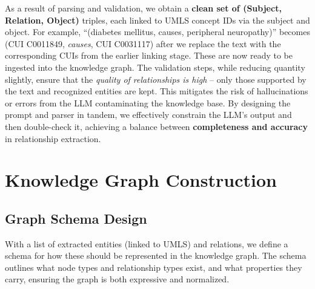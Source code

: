 As a result of parsing and validation, we obtain a \textbf{clean set of (Subject, Relation, Object)} triples, each linked to UMLS concept IDs via the subject and object. For example, ``(diabetes mellitus, causes, peripheral neuropathy)'' becomes (CUI C0011849, \textit{causes}, CUI C0031117) after we replace the text with the corresponding CUIs from the earlier linking stage. These are now ready to be ingested into the knowledge graph. The validation steps, while reducing quantity slightly, ensure that the \textit{quality of relationships is high} – only those supported by the text and recognized entities are kept. This mitigates the risk of hallucinations or errors from the LLM contaminating the knowledge base. By designing the prompt and parser in tandem, we effectively constrain the LLM's output and then double-check it, achieving a balance between \textbf{completeness and accuracy} in relationship extraction.

\section{Knowledge Graph Construction}
\label{sec:graphconstruction}

\subsection{Graph Schema Design}

With a list of extracted entities (linked to UMLS) and relations, we define a schema for how these should be represented in the knowledge graph. The schema outlines what node types and relationship types exist, and what properties they carry, ensuring the graph is both expressive and normalized.

